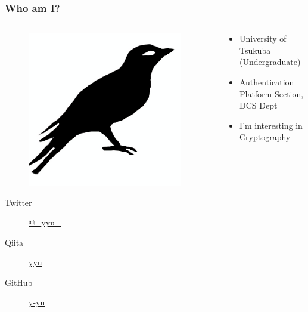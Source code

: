 \begin{frame}
  \frametitle{Who am I?}
  
  \begin{columns}
    \begin{column}{0.3\textwidth}
      \centering
      \begin{figure}
        \includegraphics[width=0.95\textwidth]{img/bird2x.png}
      \end{figure}

      \begin{description}
        \item[Twitter] \href{https://twitter.com/\_yyu\_}{@\_yyu\_}
        \item[Qiita] \href{http://qiita.com/yyu}{yyu}
        \item[GitHub] \href{https://github.com/y-yu}{y-yu}
      \end{description}
    \end{column}
    \begin{column}{0.7\textwidth}
      \begin{itemize}
        \item<2-> University of Tsukuba (Undergraduate)
        \item<3-> Authentication Platform Section, DCS Dept
        \item<4-> I'm interesting in Cryptography
      \end{itemize}
    \end{column}
  \end{columns}
\end{frame}

